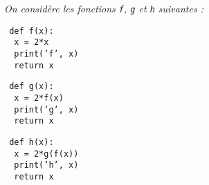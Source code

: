 \begin{td}\label{td:portee}
\em
On considère les fonctions {\tt f}, {\tt g} et {\tt h} suivantes :

\begin{py}{2.5cm}\tt
def f(x):\\
\mbox{}\ \ x = 2*x\\
\mbox{}\ \ print('f', x)\\
\mbox{}\ \ return x
\end{py}
\hfill
\begin{py}{2.5cm}\tt
def g(x):\\
\mbox{}\ \ x = 2*f(x)\\
\mbox{}\ \ print('g', x)\\
\mbox{}\ \ return x
\end{py}
\hfill
\begin{py}{2.5cm}\tt
def h(x):\\
\mbox{}\ \ x = 2*g(f(x))\\
\mbox{}\ \ print('h', x)\\
\mbox{}\ \ return x
\end{py}
\mbox{}\vspace*{2mm}


\end{td}
